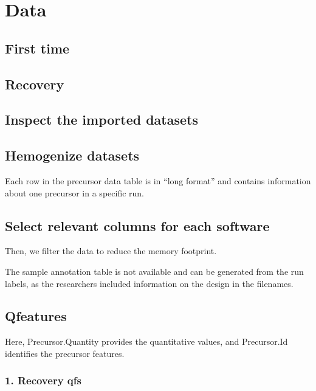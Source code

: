 \documentclass[
  10pt,
]{article}
\begin{document}
\section{Data}\label{data}

\subsection{First time}\label{first-time}

\subsection{Recovery}\label{recovery}

\subsection{Inspect the imported
datasets}\label{inspect-the-imported-datasets}

\subsection{Hemogenize datasets}\label{hemogenize-datasets}

Each row in the precursor data table is in ``long format'' and contains
information about one precursor in a specific run.

\subsection{Select relevant columns for each
software}\label{select-relevant-columns-for-each-software}

Then, we filter the data to reduce the memory footprint.

The sample annotation table is not available and can be generated from
the run labels, as the researchers included information on the design in
the filenames.

\subsection{Qfeatures}\label{qfeatures}

Here, Precursor.Quantity provides the quantitative values, and
Precursor.Id identifies the precursor features.

\subsubsection{1. Recovery qfs}\label{recovery-qfs}
\end{document}
